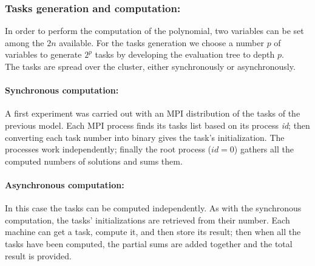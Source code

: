 \subsubsection{Tasks generation and computation: }
\label{sec:tasks}

In order to perform the computation of the polynomial, two variables can be set among the $2n$ available. For the tasks generation we choose a number $p$ of variables to generate $2^p$ tasks by developing the evaluation tree to depth $p$.\\
 
 
The tasks are spread over the cluster, either synchronously or asynchronously.

\paragraph{Synchronous computation: }
A first experiment was carried out with an MPI distribution of the tasks of the previous model. 
Each MPI process finds its tasks list based on its process \textit{id}; then converting each task number into binary gives the task's initialization. 
The processes work independently; finally the root process ($id=0$) gathers all the computed numbers of solutions and sums them.

\paragraph{Asynchronous computation: }
\label{section:asynchronous}
In this case the tasks can be computed independently. 
As with the synchronous computation, the tasks' initializations are retrieved from their number. 
Each machine can get a task,  compute it, and then store its result; then when all the tasks have been computed, the partial sums are added together and the total result is provided. 



